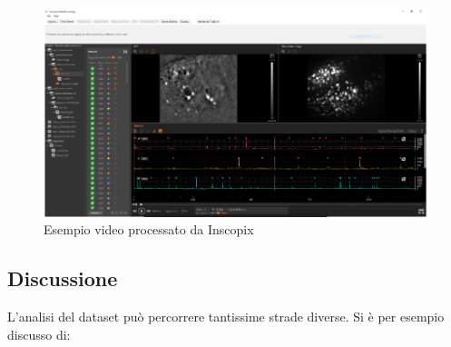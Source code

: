 \documentclass[a4paper]{article}
\begin{document}
\begin{figure}[H]
	\begin{center}
		\includegraphics[scale=.60]{inscopix.png} 
	\end{center} 
	\caption{Esempio video processato da Inscopix}
\end{figure}

\newpage
\subsection{Discussione}

L'analisi del dataset può percorrere tantissime strade diverse. Si è per esempio discusso di:
\end{document}
